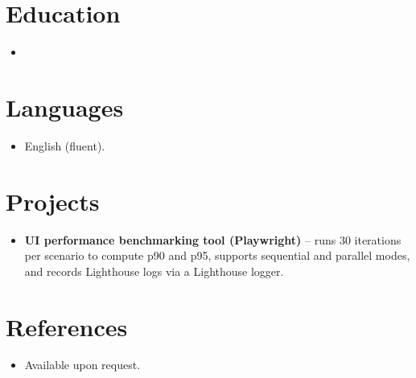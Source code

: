 \documentclass[11pt,a4paper,sans]{moderncv}
\begin{document}

\section{Education}
\vspace{1pt}
\begin{itemize}

\item{}

\end{itemize}


\section{Languages}
\vspace{1pt}
\begin{itemize}
\item {English (fluent).}
\end{itemize}

\section{Projects}
\vspace{1pt}
\begin{itemize}
\item{\textbf{UI performance benchmarking tool (Playwright)} -- runs 30 iterations per scenario to compute p90 and p95, supports sequential and parallel modes, and records Lighthouse logs via a Lighthouse logger.}
\end{itemize}

\section{References}
\vspace{1pt}
\begin{itemize}
\item{Available upon request.}
\end{itemize}
\end{document}
